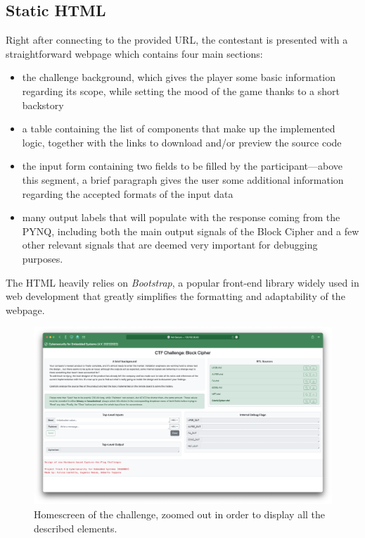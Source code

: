 \subsection{Static HTML}
Right after connecting to the provided URL, the contestant is presented with a straightforward webpage which contains four main sections:
\begin{itemize}
\item the challenge background, which gives the player some basic information regarding its scope, while setting the mood of the game thanks to a short backstory
\item a table containing the list of components that make up the implemented logic, together with the links to download and/or preview the source code
\item the input form containing two fields to be filled by the participant---above this segment, a brief paragraph gives the user some additional information regarding the accepted formats of the input data
\item many output labels that will populate with the response coming from the PYNQ, including both the main output signals of the Block Cipher and a few other relevant signals that are deemed very important for debugging purposes.
\end{itemize}

The HTML heavily relies on \emph{Bootstrap}, a popular front-end library widely used in web development that greatly simplifies the formatting and adaptability of the webpage.
\begin{figure}[!ht]
\vspace{0.5cm}
\includegraphics[width=\textwidth]{images/home.png}
\caption{Homescreen of the challenge, zoomed out in order to display all the described elements.}
\end{figure}
